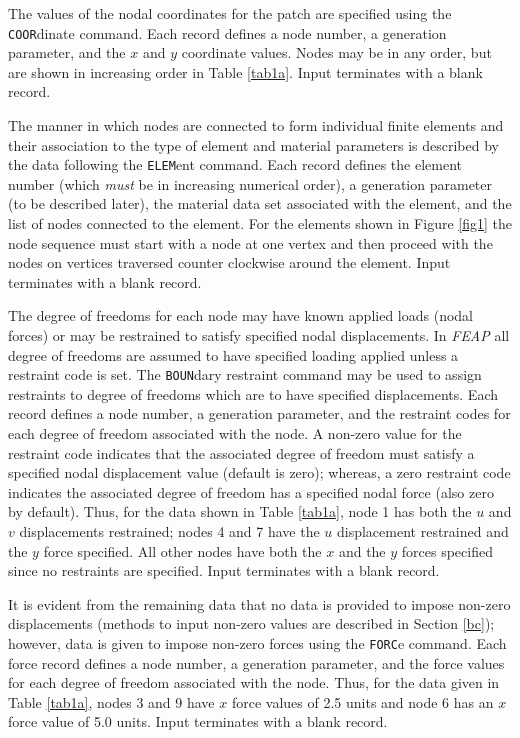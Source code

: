 The values of the nodal coordinates for the patch are specified using the 
{\tt COOR}dinate command.  Each record defines a node number, a generation
parameter, and the $x$ and $y$ coordinate
values.  Nodes may be in any order, but are shown in increasing order
in Table \ref{tab1a}.  Input terminates with a blank record.

The manner in which nodes are connected to form individual
finite elements and their association to the type of element and material
parameters is described by the data following the {\tt ELEM}ent command.
Each record defines the element number (which {\it must} be in increasing
numerical order), a generation parameter (to be described later), the
material data set associated with the element, and the list of nodes connected
to the element.  For the elements shown in Figure \ref{fig1} the node sequence
must start with a node at one vertex and then proceed with the nodes
on vertices traversed counter clockwise around the element.
Input terminates with a blank record.

The degree of freedoms for each node may have known applied loads (nodal
forces) or may be restrained to satisfy specified nodal displacements.
In {\sl FEAP} all degree of freedoms are assumed to have specified loading
applied unless a restraint code is set.  The {\tt BOUN}dary restraint
command may be used to assign restraints to degree of freedoms which are
to have specified displacements.
Each record defines a node number, a generation parameter,
and the restraint codes for each degree of freedom associated with
the node. A non-zero value for the restraint code 
indicates that the associated degree of freedom must satisfy a specified
nodal displacement value (default is zero); whereas, a zero restraint
code indicates the associated degree of freedom has a specified nodal
force (also zero by default).  Thus, for the data shown in Table \ref{tab1a},
node 1 has both the $u$ and $v$ displacements restrained; nodes 4 and 7
have the $u$ displacement restrained and the $y$ force specified.  All
other nodes have both the $x$ and the $y$ forces specified since no
restraints are specified.
Input terminates with a blank record.

It is evident from the remaining data that
no data is provided to impose non-zero displacements (methods to input
non-zero values are described in Section \ref{bc}); however, data is given to
impose non-zero forces using the {\tt FORC}e command.  
Each force record defines a node number, a generation parameter,
and the force values for each degree of freedom associated with
the node.  Thus, for the data given in Table \ref{tab1a}, nodes 3 and 9 have
$x$ force values of 2.5 units and node 6 has an $x$ force value of 5.0
units. Input terminates with a blank record.

